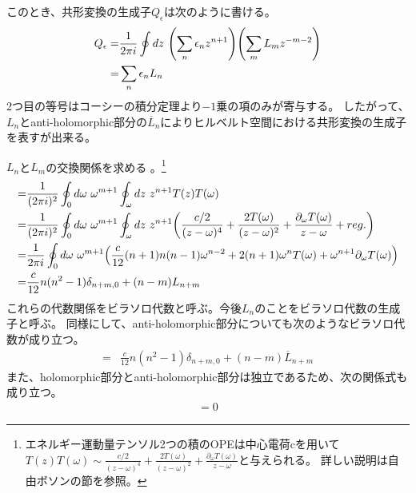 \documentclass[11pt, dvipdfmx]{article}
\numberwithin{equation}{section}
\newcommand{\blankline}{\par\vspace{\baselineskip}} %
\begin{document}
このとき、共形変換の生成子$Q_{\epsilon}$は次のように書ける。
\begin{align}
    Q_{\epsilon}=&\frac{1}{2\pi i}\oint dz \ \qty(\sum_{n}\epsilon_n z^{n+1})\qty( \sum_{m}L_m z^{-m-2})\\
    =&\sum_{n}\epsilon_n L_n
\end{align}
2つ目の等号はコーシーの積分定理より$-1$乗の項のみが寄与する。
したがって、$L_n$とanti-holomorphic部分の$\overline{L}_n$によりヒルベルト空間における共形変換の生成子を表すが出来る。
\blankline
$L_n$と$L_m$の交換関係を求める
。\footnote{
    エネルギー運動量テンソル2つの積のOPEは中心電荷cを用いて
       $ T(z)T(\omega)\sim \frac{c/2}{(z-\omega)^4}+\frac{2T(\omega)}{(z-\omega)^2}+\frac{\partial_{\omega}T(\omega)}{z-\omega}$と与えられる。
    詳しい説明は自由ボソンの節を参照。
}
\begin{align}
    [L_n,L_m]=&\frac{1}{(2\pi i)^2}\oint_{0}d\omega \ \omega^{m+1}\oint_{\omega} dz \ z^{n+1} T(z)T(\omega)\notag\\
    =&\frac{1}{(2\pi i)^2}\oint_{0}d\omega \ \omega^{m+1}\oint_{\omega} dz \ z^{n+1} \qty(\frac{c/2}{(z-\omega)^4}+\frac{2T(\omega)}{(z-\omega)^2}+\frac{\partial_{\omega}T(\omega)}{z-\omega}+reg.)\notag\\
    =&\frac{1}{2\pi i}\oint_{0}d\omega \ \omega^{m+1}\qty(\frac{c}{12}(n+1)n(n-1)\omega^{n-2}+2(n+1)\omega^n T(\omega)+\omega^{n+1}\partial_{\omega}T(\omega))\notag\\
    =&\frac{c}{12}n(n^2-1)\delta_{n+m,0} + (n - m) L_{n+m}\label{virasoro algebra}
\end{align}
これらの代数関係をビラソロ代数と呼ぶ。今後$L_n$のことをビラソロ代数の生成子と呼ぶ。
同様にして、anti-holomorphic部分についても次のようなビラソロ代数が成り立つ。
\begin{align}
    [\overline{L}_n,\overline{L}_m]=&\frac{c}{12}n(n^2-1)\delta_{n+m,0} + (n - m) \overline{L}_{n+m}
\end{align}
また、holomorphic部分とanti-holomorphic部分は独立であるため、次の関係式も成り立つ。
\begin{align}
    [L_n,\overline{L}_m]=0
\end{align}
\end{document}
